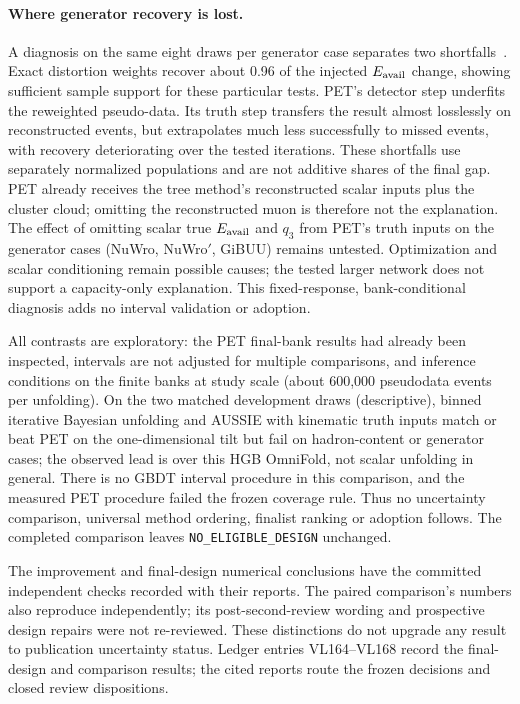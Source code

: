 \paragraph{Where generator recovery is lost.} A diagnosis on the same eight draws per generator case separates two shortfalls~\cite{PETGeneratorDiagnosis2026}. Exact distortion weights recover about 0.96 of the injected $E_{\mathrm{avail}}$ change, showing sufficient sample support for these particular tests. PET's detector step underfits the reweighted pseudo-data. Its truth step transfers the result almost losslessly on reconstructed events, but extrapolates much less successfully to missed events, with recovery deteriorating over the tested iterations. These shortfalls use separately normalized populations and are not additive shares of the final gap. PET already receives the tree method's reconstructed scalar inputs plus the cluster cloud; omitting the reconstructed muon is therefore not the explanation. The effect of omitting scalar true $E_{\mathrm{avail}}$ and $q_3$ from PET's truth inputs on the generator cases (NuWro, NuWro$'$, GiBUU) remains untested. Optimization and scalar conditioning remain possible causes; the tested larger network does not support a capacity-only explanation. This fixed-response, bank-conditional diagnosis adds no interval validation or adoption.

All contrasts are exploratory: the PET final-bank results had already been inspected, intervals are not adjusted for multiple comparisons, and inference conditions on the finite banks at study scale (about 600,000 pseudodata events per unfolding). On the two matched development draws (descriptive), binned iterative Bayesian unfolding and AUSSIE with kinematic truth inputs match or beat PET on the one-dimensional tilt but fail on hadron-content or generator cases; the observed lead is over this HGB OmniFold, not scalar unfolding in general. There is no GBDT interval procedure in this comparison, and the measured PET procedure failed the frozen coverage rule. Thus no uncertainty comparison, universal method ordering, finalist ranking or adoption follows. The completed comparison leaves \texttt{NO\_ELIGIBLE\_DESIGN} unchanged.

The improvement and final-design numerical conclusions have the committed independent checks recorded with their reports. The paired comparison's numbers also reproduce independently; its post-second-review wording and prospective design repairs were not re-reviewed. These distinctions do not upgrade any result to publication uncertainty status. Ledger entries VL164--VL168 record the final-design and comparison results; the cited reports route the frozen decisions and closed review dispositions.
